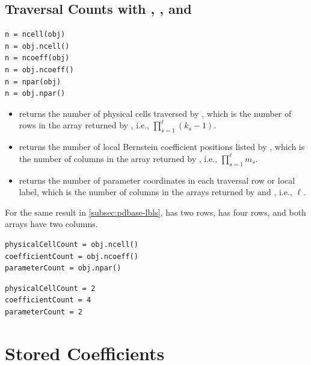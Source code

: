 \subsection{Traversal Counts with \texorpdfstring{}{ncell}, \texorpdfstring{}{ncoeff}, and \texorpdfstring{}{npar}}
\label{sec:pdbase-counts}

\syntaxhead
\begin{lstlisting}[style=dpsyntax]
n = ncell(obj)
n = obj.ncell()
n = ncoeff(obj)
n = obj.ncoeff()
n = npar(obj)
n = obj.npar()
\end{lstlisting}

\arghead
\begin{itemize}
    \item {} returns the number of physical cells traversed by , which is the number of rows in the array returned by , i.e., $\prod_{s=1}^{\ell}(k_s-1)$.
    \item {} returns the number of local Bernstein coefficient positions listed by , which is the number of columns in the array returned by , i.e., $\prod_{s=1}^{\ell} m_s$.
    \item {} returns the number of parameter coordinates in each traversal row or local label, which is the number of columns in the arrays returned by  and , i.e., $\ell$.
\end{itemize}

\examplehead
For the same result in \cref{subsec:pdbase-lbls},  has two rows,  has four rows, and both arrays have two columns.

\begin{lstlisting}[style=dpmatlab]
physicalCellCount = obj.ncell()
coefficientCount = obj.ncoeff()
parameterCount = obj.npar()
\end{lstlisting}

\begin{lstlisting}[style=dpoutput]
physicalCellCount = 2
coefficientCount = 4
parameterCount = 2
\end{lstlisting}

\section{\texorpdfstring{}{evaluate} Stored Coefficients}
\label{sec:pdbase-evaluate}

